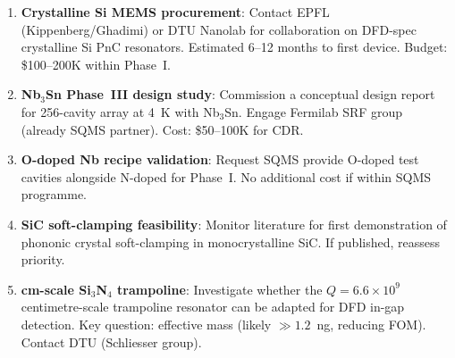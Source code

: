 \documentclass[11pt]{article}
\theoremstyle{definition}
\theoremstyle{remark}
\newcommand{\ee}[1]{\times 10^{#1}}
\begin{document}
\begin{enumerate}[nosep]
\item \textbf{Crystalline Si MEMS procurement}: Contact EPFL
  (Kippenberg/Ghadimi) or DTU Nanolab for collaboration on
  DFD-spec crystalline Si PnC resonators. Estimated 6--12 months
  to first device. Budget: \$100--200K within Phase~I.

\item \textbf{Nb$_3$Sn Phase~III design study}: Commission a
  conceptual design report for 256-cavity array at 4~K with
  Nb$_3$Sn. Engage Fermilab SRF group (already SQMS partner).
  Cost: \$50--100K for CDR.

\item \textbf{O-doped Nb recipe validation}: Request SQMS provide
  O-doped test cavities alongside N-doped for Phase~I.
  No additional cost if within SQMS programme.

\item \textbf{SiC soft-clamping feasibility}: Monitor literature
  for first demonstration of phononic crystal soft-clamping in
  monocrystalline SiC. If published, reassess priority.

\item \textbf{cm-scale Si$_3$N$_4$ trampoline}: Investigate whether
  the $Q = 6.6\ee{9}$ centimetre-scale trampoline resonator can be
  adapted for DFD in-gap detection. Key question: effective mass
  (likely $\gg 1.2$~ng, reducing FOM). Contact DTU (Schliesser group).
\end{enumerate}
\end{document}

